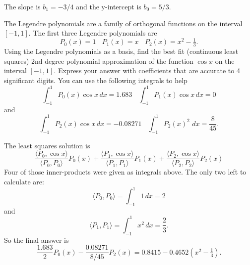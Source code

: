 \documentclass[11pt, answers]{exam}
\newcommand{\inner}[1]{\langle {#1} \rangle}
\begin{document}
\begin{questions}
\begin{parts}
\begin{solution}
The slope is $b_1 = -3/4$ and the y-intercept is $b_0 = 5/3$.  
\end{solution}
\vfill

\end{parts}

\question The Legendre polynomials are a family of orthogonal functions on the interval $[-1,1]$.  The first three Legendre polynomials are 
$$P_0(x) = 1 ~~~~ P_1(x) = x ~~~~ P_2(x) = x^2 - \tfrac{1}{3}.$$
Using the Legendre polynomials as a basis, find the best fit (continuous least squares) 2nd degree polynomial approximation of the function $\cos x$ on the interval $[-1,1]$. Express your answer with coefficients that are accurate to 4 significant digits. You can use the following integrals to help
$$\int_{-1}^1 P_0(x) \cos x \,dx = 1.683 ~~~~ \int_{-1}^1 P_1(x) \cos x \,dx = 0$$
and
$$\int_{-1}^1 P_2(x) \cos x \,dx = -0.08271 ~~~~ \int_{-1}^1 P_2(x)^2 \, \, dx = \frac{8}{45}.$$ 
\begin{solution}
The least squares solution is 
$$\frac{\inner{P_0,\cos x}}{\inner{P_0,P_0}} P_0(x) + \frac{\inner{P_1,\cos x}}{\inner{P_1,P_1}} P_1(x) +\frac{\inner{P_2,\cos x}}{\inner{P_2,P_2}} P_2(x)$$
Four of those inner-products were given as integrals above.  The only two left to calculate are:
$$\inner{P_0,P_0} = \int_{-1}^1 1 \,dx = 2$$
and
$$\inner{P_1,P_1} = \int_{-1}^1 x^2 \,dx = \frac{2}{3}.$$
So the final answer is 
$$\frac{1.683}{2} P_0(x) - \frac{0.08271}{8/45} P_2(x) = 0.8415 - 0.4652 (x^2- \tfrac{1}{3}).$$
\end{solution}
\vfill

\newpage


\end{questions}
\end{document}
